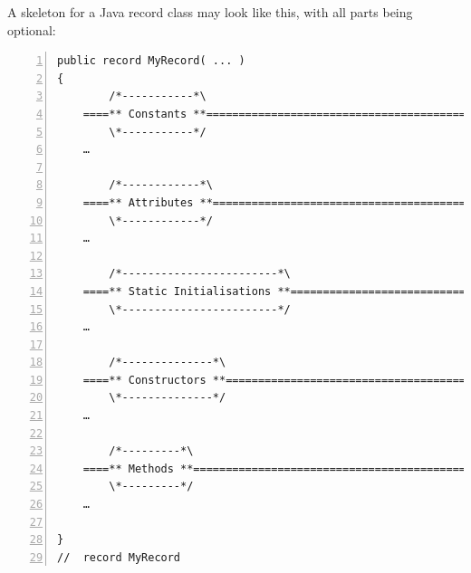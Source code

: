 \documentclass[12pt,a4paper,titlepage, parskip=half, headsepline, footsepline, cleardoubleplain]{scrbook}
\begin{document}
A skeleton for a Java record class may look like this, with all parts being optional:
\begin{lstlisting}[numbers=left,caption={Record Skeleton}]
public record MyRecord( ... ) 
{
        /*-----------*\
    ====** Constants **==============================================
        \*-----------*/
    …
        
        /*------------*\
    ====** Attributes **=============================================
        \*------------*/
    …
        
        /*------------------------*\
    ====** Static Initialisations **=================================
        \*------------------------*/
    …
        
        /*--------------*\
    ====** Constructors **===========================================
        \*--------------*/
    …
        
        /*---------*\
    ====** Methods **================================================
        \*---------*/
    …
                
}
//  record MyRecord
\end{lstlisting}
 
\end{document}
